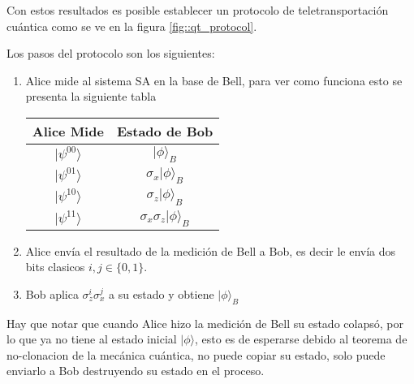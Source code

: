 \documentclass[a4paper]{article}
\begin{document}
Con estos resultados es posible establecer un protocolo de teletransportación cuántica como se ve en la figura \ref{fig::qt_protocol}.

\newpage
Los pasos del protocolo son los siguientes:
\begin{enumerate}
\item Alice mide al sistema SA en la base de Bell, para ver como funciona esto se presenta la siguiente tabla
\begin{center}
\begin{tabular}{ |c|c| } 
 \hline
 Alice Mide & Estado de Bob\\ \hline
 $|\psi^{00}\rangle$  & $|\phi\rangle_B$\\\hline
 $|\psi^{01}\rangle$  & $\sigma_x|\phi\rangle_B$\\\hline
 $|\psi^{10}\rangle$  & $\sigma_z|\phi\rangle_B$\\\hline
 $|\psi^{11}\rangle$  & $\sigma_x\sigma_z|\phi\rangle_B$\\
 \hline
\end{tabular}
\end{center}

\item Alice envía el resultado de la medición de Bell a Bob, es decir le envía dos bits clasicos $i,j \in \{0,1\}$.
\item Bob aplica $\sigma_z^i\sigma_x^j$ a su estado y obtiene $|\phi\rangle_B$
\end{enumerate}
Hay que notar que cuando Alice hizo la medición de Bell su estado colapsó, por lo que ya no  tiene al estado inicial $|\phi\rangle$, esto es de esperarse debido al teorema de no-clonacion de la mecánica cuántica, no puede copiar su estado, solo puede enviarlo a Bob destruyendo su estado en el proceso.
\end{document}
